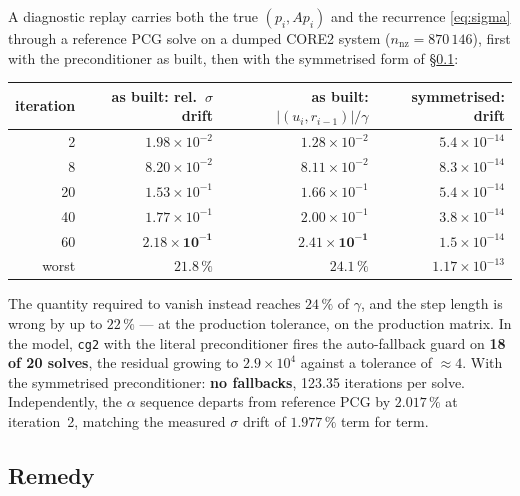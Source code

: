 \documentclass[11pt,a4paper]{article}
\begin{document}
A diagnostic replay carries both the true $(p_i,Ap_i)$ and the recurrence
\eqref{eq:sigma} through a reference PCG solve on a dumped CORE2 system
($n_{\mathrm{nz}}=870\,146$), first with the preconditioner as built, then with the
symmetrised form of \S\ref{sec:fix}:

\begin{center}
\begin{tabular}{@{}rrrr@{}}
\toprule
iteration & as built: rel.\ $\sigma$ drift & as built: $|(u_i,r_{i-1})|/\gamma$ & symmetrised: drift\\
\midrule
2  & $1.98\times10^{-2}$ & $1.28\times10^{-2}$ & $5.4\times10^{-14}$\\
8  & $8.20\times10^{-2}$ & $8.11\times10^{-2}$ & $8.3\times10^{-14}$\\
20 & $1.53\times10^{-1}$ & $1.66\times10^{-1}$ & $5.4\times10^{-14}$\\
40 & $1.77\times10^{-1}$ & $2.00\times10^{-1}$ & $3.8\times10^{-14}$\\
60 & $\mathbf{2.18\times10^{-1}}$ & $\mathbf{2.41\times10^{-1}}$ & $1.5\times10^{-14}$\\
\midrule
worst & $\mathbf{21.8\,\%}$ & $\mathbf{24.1\,\%}$ & $1.17\times10^{-13}$\\
\bottomrule
\end{tabular}
\end{center}

The quantity required to vanish instead reaches $24\,\%$ of $\gamma$, and the step length
is wrong by up to $22\,\%$ --- at the production tolerance, on the production matrix.
In the model, \texttt{cg2} with the literal preconditioner fires the auto-fallback guard
on \textbf{18 of 20 solves}, the residual growing to $2.9\times10^{4}$ against a tolerance
of $\approx 4$. With the symmetrised preconditioner: \textbf{no fallbacks}, 123.35
iterations per solve. Independently, the $\alpha$ sequence departs from reference PCG by
$2.017\,\%$ at iteration~2, matching the measured $\sigma$ drift of $1.977\,\%$ term for
term.

\subsection{Remedy}
\label{sec:fix}
\end{document}
